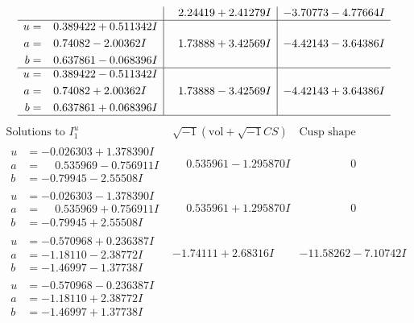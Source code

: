 \documentclass[1p]{elsarticle_modified}
\theoremstyle{definition}
\newcommand{\I}{\sqrt{-1}}
\begin{document}
$$\begin{array}{c|c|c}
 & \phantom{-}2.24419 + 2.41279 I & -3.70773 - 4.77664 I \\ \hline\begin{aligned}
u &= \phantom{-}0.389422 + 0.511342 I \\
a &= \phantom{-}0.74082 - 2.00362 I \\
b &= \phantom{-}0.637861 - 0.068396 I\end{aligned}
 & \phantom{-}1.73888 + 3.42569 I & -4.42143 - 3.64386 I \\ \hline\begin{aligned}
u &= \phantom{-}0.389422 - 0.511342 I \\
a &= \phantom{-}0.74082 + 2.00362 I \\
b &= \phantom{-}0.637861 + 0.068396 I\end{aligned}
 & \phantom{-}1.73888 - 3.42569 I & -4.42143 + 3.64386 I\\
 \hline 
 \end{array}$$\newpage$$\begin{array}{c|c|c}  
\text{Solutions to }I^u_{1}& \I (\text{vol} + \sqrt{-1}CS) & \text{Cusp shape}\\
 \hline 
\begin{aligned}
u &= -0.026303 + 1.378390 I \\
a &= \phantom{-}0.535969 - 0.756911 I \\
b &= -0.79945 - 2.55508 I\end{aligned}
 & \phantom{-}0.535961 - 1.295870 I & \phantom{-0.000000 } 0 \\ \hline\begin{aligned}
u &= -0.026303 - 1.378390 I \\
a &= \phantom{-}0.535969 + 0.756911 I \\
b &= -0.79945 + 2.55508 I\end{aligned}
 & \phantom{-}0.535961 + 1.295870 I & \phantom{-0.000000 } 0 \\ \hline\begin{aligned}
u &= -0.570968 + 0.236387 I \\
a &= -1.18110 - 2.38772 I \\
b &= -1.46997 - 1.37738 I\end{aligned}
 & -1.74111 + 2.68316 I & -11.58262 - 7.10742 I \\ \hline\begin{aligned}
u &= -0.570968 - 0.236387 I \\
a &= -1.18110 + 2.38772 I \\
b &= -1.46997 + 1.37738 I\end{aligned}

\end{array}$$
\end{document}
